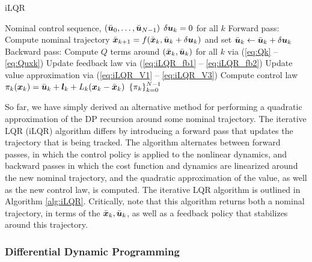 \begin{algorithm}[t]
\caption{iLQR}
\centering
\label{alg:iLQR}

\begin{algorithmic}[1]
\Require Nominal control sequence, $(\bar{\bm{u}}_0, \ldots, \bar{\bm{u}}_{N-1})$
    \State $\delta \bm{u}_k = 0$ for all $k$ 
    \Statex Forward pass:
    \State Compute nominal trajectory $\bar{\bm{x}}_{k+1} = f(\bar{\bm{x}}_k, \bar{\bm{u}}_k + \delta \bm{u}_k)$ and set $\bar{\bm{u}}_k \gets \bar{\bm{u}}_k + \delta \bm{u}_k$
    \Statex Backward pass:
    \State Compute $Q$ terms around $(\bar{\bm{x}}_k, \bar{\bm{u}}_k)$ for all $k$ via (\ref{eq:Qk} -- \ref{eq:Quxk})
    \State Update feedback law via (\ref{eq:iLQR_fb1} -- \ref{eq:iLQR_fb2})
    \State Update value approximation via (\ref{eq:iLQR_V1} -- \ref{eq:iLQR_V3})
    \EndWhile
    \State Compute control law $\pi_k(\bm{x}_k) = \bar{\bm{u}}_k + \bm{l}_k + L_k(\bm{x}_k - \bar{\bm{x}}_k)$
    \State \Return $\{\pi_k\}_{k=0}^{N-1}$
  \end{algorithmic}
\end{algorithm}

So far, we have simply derived an alternative method for performing a quadratic approximation of the DP recursion around some nominal trajectory. The iterative LQR (iLQR) algorithm differs by introducing a forward pass that updates the trajectory that is being tracked. The algorithm alternates between forward passes, in which the control policy is applied to the nonlinear dynamics, and backward passes in which the cost function and dynamics are linearized around the new nominal trajectory, and the quadratic approximation of the value, as well as the new control law, is computed. The iterative LQR algorithm is outlined in Algorithm \ref{alg:iLQR}. Critically, note that this algorithm returns both a nominal trajectory, in terms of the $\bar{\bm{x}}_k, \bar{\bm{u}}_k$, as well as a feedback policy that stabilizes around this trajectory. 

\subsubsection{Differential Dynamic Programming}

